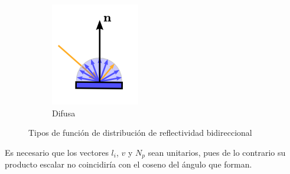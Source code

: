 \begin{figure}[!h]
\begin{subfigure}[b]{0.20\textwidth}
        \includegraphics[width=\textwidth]{Plantilla-TFG-master/img/glossyTodiffuse3.png}
        \caption{Difusa}
    \end{subfigure}
    \hfill
    \caption{Tipos de función de distribución de reflectividad bidireccional \cite{especular}}
\end{figure}

\begin{observacion}
    Es necesario que los vectores $l_i$, $v$ y $N_p$ sean unitarios, pues de lo contrario su producto escalar no coincidiría con el coseno del ángulo que forman.
\end{observacion}


